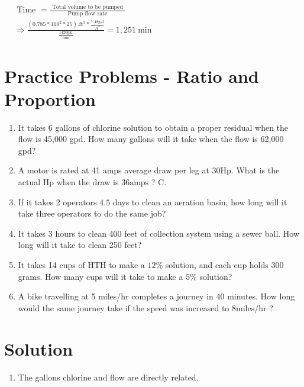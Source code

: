 \documentclass[10pt]{article}
\begin{document}
\begin{enumerate}
\begin{enumerate}
\begin{enumerate}
\end{enumerate}

$\begin{aligned} & \text { Time }= \frac{\text { Total volume to be pumped }}{\text { Pump flow rate }} \\ & \Longrightarrow \frac{\left(0.785 * 110^{2} * 25\right) . \mathrm{ft}^{3} * \frac{7.48 \mathrm{gal}}{f t^{3}}}{\frac{1420 \mathrm{gal}}{\mathrm{min}}}=1,251 \mathrm{~min}\end{aligned}$

\section{Practice Problems - Ratio and Proportion}
\begin{enumerate}
  \item It takes 6 gallons of chlorine solution to obtain a proper residual when the flow is 45,000 gpd. How many gallons will it take when the flow is 62,000 gpd?

  \item A motor is rated at 41 amps average draw per leg at $30 \mathrm{Hp}$. What is the actual $\mathrm{Hp}$ when the draw is $36 \mathrm{amps}$ ? C.

  \item If it takes 2 operators $4.5$ days to clean an aeration basin, how long will it take three operators to do the same job?

  \item It takes 3 hours to clean 400 feet of collection system using a sewer ball. How long will it take to clean 250 feet?

  \item It takes 14 cups of $\mathrm{HTH}$ to make a $12 \%$ solution, and each cup holds 300 grams. How many cups will it take to make a $5 \%$ solution?

  \item A bike travelling at 5 miles/hr completes a journey in 40 minutes. How long would the same journey take if the speed was increased to $8 \mathrm{miles} / \mathrm{hr}$ ?

\end{enumerate}

\section{Solution}
\begin{enumerate}
  \item The gallons chlorine and flow are directly related.
\end{enumerate}


\end{enumerate}
\end{enumerate}
\end{document}
